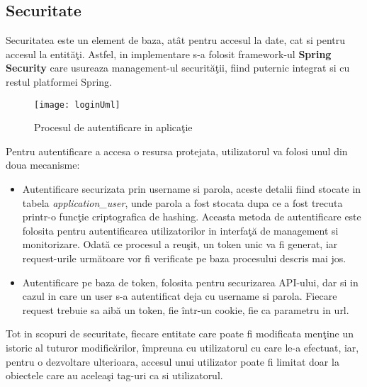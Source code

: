 \mend

\subsection{Securitate}
Securitatea este un element de baza, atât pentru accesul la date, cat si pentru accesul la entităţi. Astfel, in implementare s-a folosit framework-ul \textbf{Spring Security} care usureaza management-ul securităţii, fiind puternic integrat si cu restul platformei Spring.
\begin{figure}[H]
	\centering
	\texttt{[image: loginUml]}
	\caption{Procesul de autentificare in aplicaţie}
	\label{fig:loginUml}
\end{figure}
Pentru autentificare a accesa o resursa protejata, utilizatorul va folosi unul din doua mecanisme:
\begin{itemize}
	\item Autentificare securizata prin username si parola, aceste detalii fiind stocate in tabela \textit{application\_user}, unde parola a fost stocata dupa ce a fost trecuta printr-o funcţie criptografica de hashing. Aceasta metoda de autentificare este folosita pentru autentificarea utilizatorilor in interfaţă de management si monitorizare. Odată ce procesul a reuşit, un token unic va fi generat, iar request-urile următoare vor fi verificate pe baza procesului descris mai jos.
	\item Autentificare pe baza de token, folosita pentru securizarea API-ului, dar si in cazul in care un user s-a autentificat deja cu username si parola. Fiecare request trebuie sa aibă un token, fie într-un cookie, fie ca parametru in url.
\end{itemize}

Tot in scopuri de securitate, fiecare entitate care poate fi modificata menţine un istoric al tuturor modificărilor, împreuna cu utilizatorul cu care le-a efectuat, iar, pentru o dezvoltare ulterioara, accesul unui utilizator poate fi limitat doar la obiectele care au aceleaşi tag-uri ca si utilizatorul.
